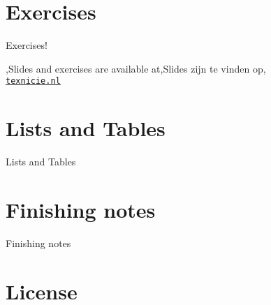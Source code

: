 \documentclass[
    english,
    everyoneauthor=true,
    defaultSlideCollection=vincent,
]{../../cursuspresentatie}
\begin{document}
\section{Exercises}
\def\placetarget{\hypertarget{exercises2}{}}

\begin{frame}
    \begin{center}
        {\LARGE Exercises!}
        \vspace{30pt}

        {\Large\lang,Slides and exercises are available at,Slides zijn te vinden op,\\
         \href{https://texnicie.nl}{\ul{\texttt{texnicie.nl}}}}
    \end{center}
\end{frame}


\section{Lists and Tables}
\def\placetarget{\hypertarget{tables}{}}

\begin{frame}
    Lists and Tables
\end{frame}

\section{Finishing notes}
\def\placetarget{\hypertarget{finishingnotes}{}}

\begin{frame}
    Finishing notes
\end{frame}


\section{License}
    
\end{document}
